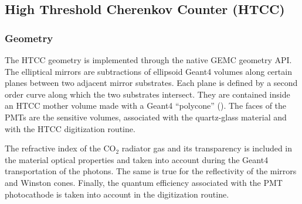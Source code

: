 \subsection{High Threshold Cherenkov Counter (HTCC)}

\subsubsection{Geometry}

The HTCC geometry is implemented through the native GEMC geometry API. The elliptical mirrors are subtractions of
ellipsoid Geant4 volumes along certain planes between two adjacent mirror substrates. Each plane is defined by a second order
curve along which the two substrates intersect.
They are contained inside an HTCC mother volume made with a Geant4 ``polycone'' ().
The faces of the PMTs are the sensitive volumes, associated with the quartz-glass material and with the HTCC digitization routine.

The refractive index of the CO$_2$ radiator gas and its transparency is included in the material optical properties and taken
into account during the Geant4 transportation of the photons. The same is true for the reflectivity of the mirrors and Winston cones.
Finally, the quantum efficiency associated with the PMT photocathode is taken into account in
the digitization routine.


